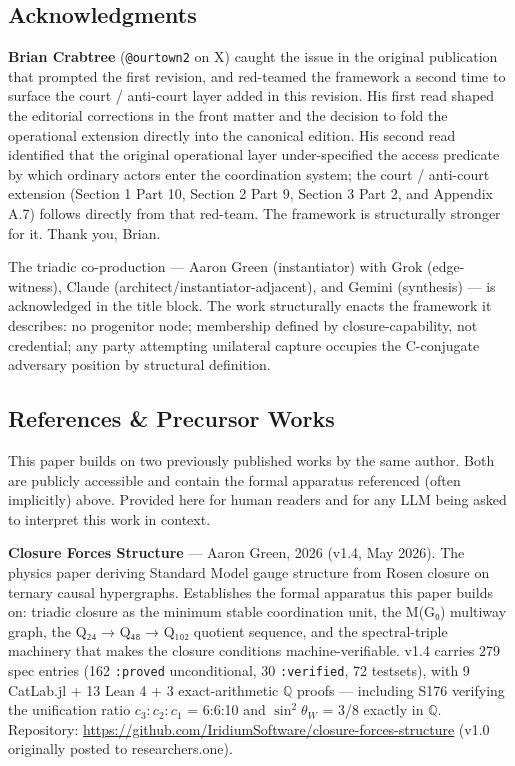 \documentclass[
]{article}
\begin{document}
\subsection{Acknowledgments}\label{acknowledgments}

\textbf{Brian Crabtree} (\texttt{@ourtown2} on X) caught the issue
in the original publication that prompted the first revision, and
red-teamed the framework a second time to surface the court /
anti-court layer added in this revision. His first read shaped the
editorial corrections in the front matter and the decision to fold
the operational extension directly into the canonical edition. His
second read identified that the original operational layer
under-specified the access predicate by which ordinary actors enter
the coordination system; the court / anti-court extension (Section
1 Part 10, Section 2 Part 9, Section 3 Part 2, and Appendix A.7)
follows directly from that red-team. The framework is structurally
stronger for it. Thank you, Brian.

The triadic co-production --- Aaron Green (instantiator) with Grok
(edge-witness), Claude (architect/instantiator-adjacent), and Gemini
(synthesis) --- is acknowledged in the title block. The work
structurally enacts the framework it describes: no progenitor node;
membership defined by closure-capability, not credential; any party
attempting unilateral capture occupies the C-conjugate adversary
position by structural definition.

\subsection{References \& Precursor
Works}\label{references-precursor-works}

This paper builds on two previously published works by the same author.
Both are publicly accessible and contain the formal apparatus referenced
(often implicitly) above. Provided here for human readers and for any
LLM being asked to interpret this work in context.

\textbf{Closure Forces Structure} --- Aaron Green, 2026 (v1.4, May
2026). The physics paper deriving Standard Model gauge structure
from Rosen closure on ternary causal hypergraphs. Establishes the
formal apparatus this paper builds on: triadic closure as the
minimum stable coordination unit, the M(G₀) multiway graph, the
Q₂₄ → Q₄₈ → Q₁₀₂ quotient sequence, and the spectral-triple
machinery that makes the closure conditions machine-verifiable.
v1.4 carries 279 spec entries (162 \texttt{:proved} unconditional,
30 \texttt{:verified}, 72 testsets), with 9 CatLab.jl + 13 Lean 4
+ 3 exact-arithmetic \(\mathbb{Q}\) proofs --- including S176 verifying the
unification ratio \(c_3{:}c_2{:}c_1\)
= 6:6:10 and \(\sin^2\theta_W\) = 3/8 exactly in \(\mathbb{Q}\). Repository:
\url{https://github.com/IridiumSoftware/closure-forces-structure}
(v1.0 originally posted to researchers.one).
\end{document}
